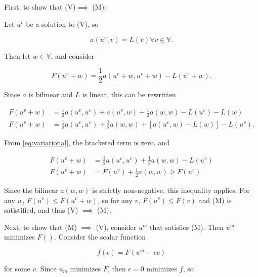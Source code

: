 \documentclass{hw-template}
\begin{document}
\subsection{} First, to show that (V)$\implies$ (M):

Let $u^v$ be a solution to (V), so

\begin{equation}\label{eq:variational}
    a(u^v, v) = L(v) \forall v \in \mathbb{V}.
\end{equation}

Then let $w \in \mathbb{V}$, and consider

\begin{equation}
    F\left( u^v + w \right) = \frac{1}{2}a\left(u^v + w, u^v + w \right) - L\left( u^v + w\right).
\end{equation}

Since $a$ is bilinear and $L$ is linear, this can be rewritten

\begin{align}
    F\left( u^v + w \right) &= \frac{1}{2}  a(u^v, u^v) + a(u^v, w) + \frac{1}{2}a(w, w) - L\left( u^v \right) - L(w)\\
    F\left( u^v + w \right) &= \frac{1}{2}  a(u^v, u^v)+ \frac{1}{2}a(w, w)  + \left[ a(u^v, w) - L(w) \right] - L\left( u^v \right).
\end{align}

From \autoref{eq:variational}, the bracketed term is zero, and 

\begin{align}
    F\left( u^v + w \right) &= \frac{1}{2}  a(u^v, u^v)+ \frac{1}{2}a(w, w)   - L\left( u^v \right)\\
    F\left( u^v + w \right) &= F(u^v) + \frac{1}{2}a(w, w) \geq F(u^v).
\end{align}

Since the bilinear $a(w,w)$ is strictly non-negative, this inequality applies. For any $w$, $F(u^v)\leq F(u^v + w)$, so for any $v$, $F(u^v)\leq F(v)$ and (M) is satistified, and thus (V) $\implies$ (M).

Next, to show that (M) $\implies$ (V), consider $u^m$ that satisfies (M). Then $u^m$ minimizes $F()$. Consider the scalar function

\begin{equation}
    f(\epsilon) = F(u^m + \epsilon v)
\end{equation}

for some $v$. Since $u_m$ minimizes $F$, then $\epsilon = 0$ minimizes $f$, so
\end{document}
